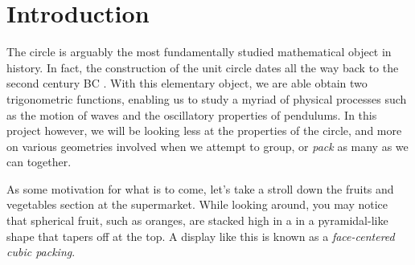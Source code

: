 \chapter{Introduction}

\begin{flushleft}
The circle is arguably the most fundamentally studied mathematical object in history. In fact, the construction of the unit circle dates all the way back to the second century BC \cite{unit_circle}. With this elementary object, we are able obtain two trigonometric functions, enabling us to study a myriad of physical processes such as the motion of waves and the oscillatory properties of pendulums. In this project however, we will be looking less at the properties of the circle, and more on various geometries involved when we attempt to group, or \textit{pack} as many as we can together. 
\end{flushleft}

\begin{flushleft}
As some motivation for what is to come, let's take a stroll down the fruits and vegetables section at the supermarket. While looking around, you may notice that spherical fruit, such as oranges, are stacked high in a in a pyramidal-like shape that tapers off at the top. A display like this is known as a \textit{face-centered cubic packing}.
\end{flushleft}

